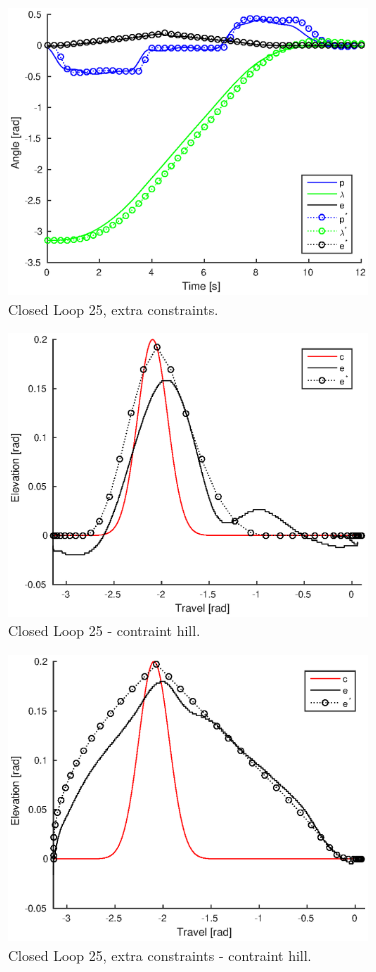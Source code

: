 \begin{figure}[hp]
	\centering
		\includegraphics[width=0.85\textwidth]{figures/4/closedloopConstrained25.eps}
	\caption{Closed Loop 25, extra constraints.}
	\label{fig:closedloopConstrained25}
\end{figure}
\begin{figure}[hp]
	\centering
		\includegraphics[width=0.85\textwidth]{figures/4/closedloop25_cons.eps}
	\caption{Closed Loop 25 - contraint hill.}
	\label{fig:closedloop25_cons}
\end{figure}
\begin{figure}[hp]
	\centering
		\includegraphics[width=0.85\textwidth]{figures/4/closedloopConstrained25_cons.eps}
	\caption{Closed Loop 25, extra constraints - contraint hill.}
	\label{fig:closedloopConstrained25_cons}
\end{figure}

